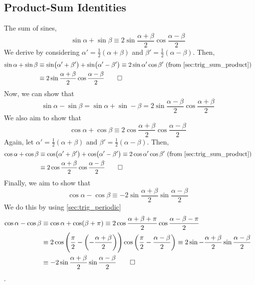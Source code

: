 \documentclass[fleqn,a4paper,11pt]{article}
\begin{document}
    \subsection{Product-Sum Identities}


    The sum of sines,
    \begin{equation}
    \sin \alpha + \sin \beta \equiv
        2 \sin \frac{\alpha + \beta}2 \cos \frac{\alpha - \beta}2
    \end{equation}
    We derive by considering \(\alpha' = \frac 12 (\alpha + \beta)\) and
    \(\beta' = \frac 12 (\alpha - \beta)\). Then,
    \begin{align*}
    \sin \alpha + \sin \beta &\equiv
     \sin(\alpha' + \beta') + \sin(\alpha' - \beta') \equiv
     2\sin \alpha' \cos \beta'\ \text{(from \ref{sec:trig_sum_product})}
    \\&\equiv 2 \sin \frac{\alpha + \beta}2 \cos \frac{\alpha - \beta} 2 \qed
    \end{align*}
    Now, we can show that
    \begin{equation}
    \sin \alpha - \sin \beta =
        \sin \alpha + \sin -\beta =
        2 \sin \frac{\alpha - \beta} 2 \cos\frac{\alpha + \beta} 2
    \end{equation}
    We also aim to show that
    \begin{equation}
    \cos \alpha + \cos \beta \equiv
        2 \cos\frac{\alpha + \beta} 2 \cos \frac{\alpha - \beta} 2
    \end{equation}
    Again, let \(\alpha' = \frac 12 (\alpha + \beta)\) and
    \(\beta' = \frac 12 (\alpha - \beta)\). Then,
    \begin{align*}
     \cos \alpha + \cos \beta &\equiv
     \cos(\alpha' + \beta') + \cos(\alpha' - \beta') \equiv
     2\cos \alpha' \cos \beta'\ \text{(from \ref{sec:trig_sum_product})}
     \\&\equiv 2 \cos\frac{\alpha + \beta} 2 \cos \frac{\alpha - \beta} 2 \qed
    \end{align*}
    Finally, we aim to show that
    \begin{equation}
    \cos \alpha - \cos \beta \equiv
     -2 \sin \frac{\alpha + \beta} 2 \sin \frac{\alpha - \beta} 2
    \end{equation}
    We do this by using \ref{sec:trig_periodic}
    \begin{align*}
     \cos \alpha - \cos \beta &\equiv
     \cos \alpha + \cos (\beta + \pi)  \equiv
     2 \cos \frac{\alpha + \beta + \pi} 2 \cos \frac {\alpha - \beta - \pi} 2
     \\&\equiv
     2 \cos \pqty{\frac \pi 2 - \pqty{-\frac{\alpha + \beta} 2}}
       \cos \pqty{\frac \pi 2 - \frac{\alpha - \beta} 2} \equiv
     2 \sin -\frac{\alpha + \beta} 2 \sin \frac{\alpha - \beta} 2 \\&\equiv
     -2 \sin \frac{\alpha + \beta} 2 \sin \frac{\alpha - \beta} 2 \qed
    \end{align*}.
\end{document}
